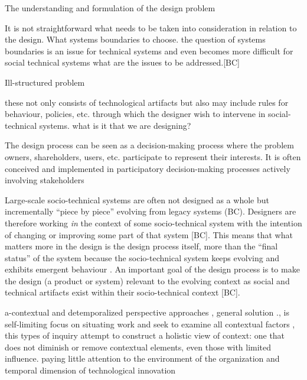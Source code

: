 \begin{svgraybox}

The understanding and formulation of the design problem 

 It is not straightforward what needs to be taken into consideration in relation to the design. What systems boundaries to choose. the question of systems boundaries is an issue for technical systems and even becomes more difficult for social technical systems
what are the issues to be addressed.[BC]

Ill-structured problem

 these not only consists of technological artifacts but also may include rules for behaviour, policies, etc. through which the designer wish to intervene in social-technical systems. what is it that we are designing? 

 The design process can be seen as a decision-making process where the problem owners, shareholders, users, etc. participate to represent their interests. It is often conceived and implemented in participatory decision-making processes actively involving stakeholders

Large-scale socio-technical systems are often not designed as a whole but incrementally ``piece by piece'' evolving from legacy systems (BC). Designers are therefore working \textit{in} the context of some socio-technical system with the intention of changing or improving some part of that system [BC]. This means that what matters more in the design is the design process itself, more than the ``final status'' of the system \cite{Shin2014, need more ref} because the socio-technical system keeps evolving and exhibits emergent behaviour \cite{Nikolic2009}. An important  goal of the design process is to make the design (a product or system) relevant to the evolving context \cite{Shin2014, need more ref} as social and technical artifacts exist within their socio-technical context [BC]. 

\end{svgraybox}



\begin{svgraybox}
a-contextual and detemporalized perspective approaches , general solution ., is self-limiting 
focus on situating work and seek to examine all contextual factors , this types of inquiry attempt to construct a holistic view of context: one that does not diminish or remove contextual elements, even those with limited influence. 
paying little attention to the environment of the organization and temporal dimension of technological innovation 
\end{svgraybox}


